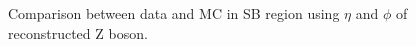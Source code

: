 \begin{figure}[hbtp]
  \centering
  \hspace{0.5cm}
  \caption{\label{fig:ZEtaPhi}Comparison between data and MC in SB region using $\eta$ and $\phi$ of reconstructed Z boson.}
\end{figure}

